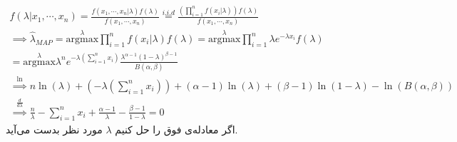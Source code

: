 \begin{gather*}
    f(\lambda | x_1, \cdots, x_n) = \frac{f(x_1, \cdots, x_n | \lambda) f(\lambda)}{f(x_1, \cdots, x_n)} \stackrel{i.i.d}{=} \frac{(\prod_{i=1}^n f(x_i|\lambda)) f(\lambda)}{f(x_1, \cdots, x_n)}\\
    \implies \hat{\lambda}_{MAP}
    = \stackrel{\lambda}{\text{argmax}} \prod_{i=1}^n f(x_i|\lambda) f(\lambda)
    = \stackrel{\lambda}{\text{argmax}} \prod_{i=1}^n \lambda e^{-\lambda x_i} f(\lambda)\\
    = \stackrel{\lambda}{\text{argmax}} \lambda^n e^{-\lambda(\sum_{i=1}^n x_i)} \frac{\lambda^{\alpha-1}(1-\lambda)^{\beta-1}} {B (\alpha,\beta)}\\
    \stackrel{\ln}{\implies} n\ln(\lambda) + (-\lambda(\sum_{i=1}^n x_i)) + (\alpha-1)\ln(\lambda) + (\beta-1) \ln(1-\lambda) - \ln(B (\alpha,\beta))\\
    \stackrel{\frac{d}{d \lambda}}{\implies} \frac{n}{\lambda} - \sum_{i=1}^n x_i + \frac{\alpha-1}{\lambda} - \frac{\beta-1}{1-\lambda} = 0
\end{gather*}
اگر معادله‌ی فوق را حل کنیم
$\lambda$
مورد نظر بدست می‌آید.





